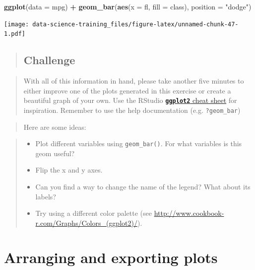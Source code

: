 \documentclass[]{book}
\newenvironment{Shaded}{\begin{snugshade}}{\end{snugshade}}
\newcommand{\KeywordTok}[1]{\textcolor[rgb]{0.13,0.29,0.53}{\textbf{#1}}}
\newcommand{\DataTypeTok}[1]{\textcolor[rgb]{0.13,0.29,0.53}{#1}}
\newcommand{\StringTok}[1]{\textcolor[rgb]{0.31,0.60,0.02}{#1}}
\newcommand{\OperatorTok}[1]{\textcolor[rgb]{0.81,0.36,0.00}{\textbf{#1}}}
\newcommand{\NormalTok}[1]{#1}
\providecommand{\tightlist}{%
  \setlength{\itemsep}{0pt}\setlength{\parskip}{0pt}}
\theoremstyle{definition}
\theoremstyle{definition}
\theoremstyle{definition}
\theoremstyle{remark}
\begin{document}
\begin{Shaded}
\begin{Highlighting}[]
    \KeywordTok{ggplot}\NormalTok{(}\DataTypeTok{data =}\NormalTok{ mpg) }\OperatorTok{+}\StringTok{ }
\StringTok{      }\KeywordTok{geom_bar}\NormalTok{(}\KeywordTok{aes}\NormalTok{(}\DataTypeTok{x =}\NormalTok{ fl, }\DataTypeTok{fill =}\NormalTok{ class), }\DataTypeTok{position =} \StringTok{"dodge"}\NormalTok{)}
\end{Highlighting}
\end{Shaded}

\texttt{[image: data-science-training\_files/figure-latex/unnamed-chunk-47-1.pdf]}

\begin{quote}
\subsection{Challenge}\label{challenge-1}
\end{quote}

\begin{quote}
With all of this information in hand, please take another five minutes
to either improve one of the plots generated in this exercise or create
a beautiful graph of your own. Use the RStudio
\href{https://www.rstudio.com/wp-content/uploads/2016/11/ggplot2-cheatsheet-2.1.pdf}{\textbf{\texttt{ggplot2}}
cheat sheet} for inspiration. Remember to use the help documentation
(e.g. \texttt{?geom\_bar})
\end{quote}

\begin{quote}
Here are some ideas:
\end{quote}

\begin{quote}
\begin{itemize}
\tightlist
\item
  Plot different variables using \texttt{geom\_bar()}. For what
  variables is this geom useful?
\item
  Flip the x and y axes.
\item
  Can you find a way to change the name of the legend? What about its
  labels?
\item
  Try using a different color palette (see
  \url{http://www.cookbook-r.com/Graphs/Colors_(ggplot2)/}).
\end{itemize}
\end{quote}

\section{Arranging and exporting
plots}\label{arranging-and-exporting-plots}
\end{document}
